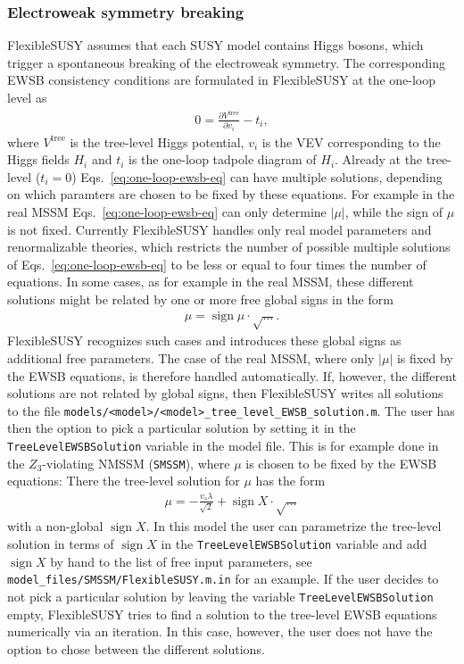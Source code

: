 \documentclass[final,3p,11pt,pdflatex]{elsarticle}
\makeatletter
\newcommand{\fs}{FlexibleSUSY\@\xspace}
\newcommand{\code}[1]{\lstinline|#1|}  %
\DeclareMathOperator{\sign}{sign}
\makeatother
\begin{document}
\subsubsection{Electroweak symmetry breaking}
\label{sec:ewsb}

\fs assumes that each SUSY model contains Higgs bosons, which trigger
a spontaneous breaking of the electroweak symmetry.  The corresponding
EWSB consistency conditions are formulated in \fs at the one-loop
level as
%
\begin{align}
  0 = \frac{\partial V^\text{tree}}{\partial v_i} - t_i,
  \label{eq:one-loop-ewsb-eq}
\end{align}
%
where $V^\text{tree}$ is the tree-level Higgs potential, $v_i$ is the
VEV corresponding to the Higgs fields $H_i$ and $t_i$ is the one-loop
tadpole diagram of $H_i$.  Already at the tree-level ($t_i = 0$) Eqs.\
\eqref{eq:one-loop-ewsb-eq} can have multiple solutions, depending on
which paramters are chosen to be fixed by these equations.  For
example in the real MSSM Eqs.\ \eqref{eq:one-loop-ewsb-eq} can only
determine $|\mu|$, while the sign of $\mu$ is not fixed.  Currently
\fs handles only real model parameters and renormalizable theories,
which restricts the number of possible multiple solutions of Eqs.\
\eqref{eq:one-loop-ewsb-eq} to be less or equal to four times the
number of equations.  In some cases, as for example in the real MSSM,
these different solutions might be related by one or more free global
signs in the form
%
\begin{align}
  \mu = \sign\mu \cdot \sqrt{\ldots} .
\end{align}
%
\fs recognizes such cases and introduces these global signs as
additional free parameters.  The case of the real MSSM, where only
$|\mu|$ is fixed by the EWSB equations, is therefore handled
automatically.  If, however, the different solutions are not related
by global signs, then \fs writes all solutions to the file
\code{models/<model>/<model>_tree_level_EWSB_solution.m}.  The user
has then the option to pick a particular solution by setting it in the
\code{TreeLevelEWSBSolution} variable in the model file.  This is for
example done in the $Z_3$-violating NMSSM (\code{SMSSM}), where $\mu$
is chosen to be fixed by the EWSB equations: There the tree-level
solution for $\mu$ has the form
%
\begin{align}
  \mu = -\frac{v_s \lambda}{\sqrt{2}} + \sign X \cdot \sqrt{\ldots}
\end{align}
%
with a non-global $\sign X$.  In this model the user can parametrize
the tree-level solution in terms of $\sign X$ in the
\code{TreeLevelEWSBSolution} variable and add $\sign X$ by hand to the
list of free input parameters, see
\code{model_files/SMSSM/FlexibleSUSY.m.in} for an example.  If the
user decides to not pick a particular solution by leaving the variable
\code{TreeLevelEWSBSolution} empty, \fs tries to find a solution to
the tree-level EWSB equations numerically via an iteration.  In this
case, however, the user does not have the option to chose between the
different solutions.
\end{document}
